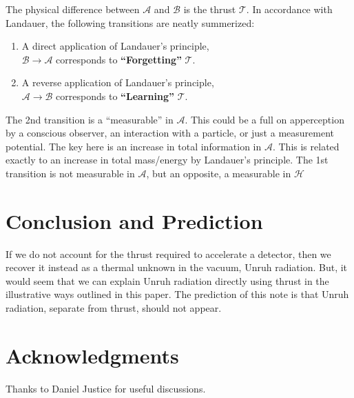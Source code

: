 \documentclass[12pt,a4paper]{article}
\begin{document}
The physical difference between $\mathcal{A}$ and $\mathcal{B}$ is the thrust $\mathcal{T}$.  In accordance with Landauer, the following transitions are neatly summerized:
\begin{enumerate}
\item A direct application of Landauer's principle, \\ \hspace*{1 in} $\mathcal{B} \rightarrow \mathcal{A}$ corresponds to {\bf ``Forgetting''} $\mathcal{T}$.\\
\item A reverse application of Landauer's principle, \\ \hspace*{1 in} $\mathcal{A} \rightarrow \mathcal{B}$ corresponds to {\bf ``Learning''} $\mathcal{T}$.\\
\end{enumerate}
The 2nd transition is a ``measurable'' in $\mathcal{A}$. This could be a full on apperception by a conscious observer, an interaction with a particle, or just a measurement potential.  The key here is an increase in total information in $\mathcal{A}$.  This is related exactly to an increase in total mass/energy by Landauer's principle.  The 1st transition is not measurable in $\mathcal{A}$, but an opposite, a measurable in $\mathcal{H}$


\section{Conclusion and Prediction}
If we do not account for the thrust required to accelerate a detector, then we recover it instead as a thermal unknown in the vacuum, Unruh radiation.  But, it would seem that we can explain Unruh radiation directly using thrust in the illustrative ways outlined in this paper.  The prediction of this note is that Unruh radiation, separate from thrust, should not appear.

\section{Acknowledgments}
Thanks to Daniel Justice for useful discussions.



\end{document}
